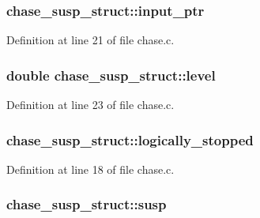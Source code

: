 \subsubsection[{\texorpdfstring{input\+\_\+ptr}{input_ptr}}]{ chase\+\_\+susp\+\_\+struct\+::input\+\_\+ptr}\hypertarget{structchase__susp__struct_a1b2512903a8579d8b1aa07ce6400b570}{}\label{structchase__susp__struct_a1b2512903a8579d8b1aa07ce6400b570}


Definition at line 21 of file chase.\+c.

\subsubsection[{\texorpdfstring{level}{level}}]{\setlength{\rightskip}{0pt plus 5cm}double chase\+\_\+susp\+\_\+struct\+::level}\hypertarget{structchase__susp__struct_ad5e4cbfa7a7cd17bd41fb7fa50c70836}{}\label{structchase__susp__struct_ad5e4cbfa7a7cd17bd41fb7fa50c70836}


Definition at line 23 of file chase.\+c.

\subsubsection[{\texorpdfstring{logically\+\_\+stopped}{logically_stopped}}]{ chase\+\_\+susp\+\_\+struct\+::logically\+\_\+stopped}\hypertarget{structchase__susp__struct_a4a108829cac873ae43abe54fb908d435}{}\label{structchase__susp__struct_a4a108829cac873ae43abe54fb908d435}


Definition at line 18 of file chase.\+c.

\subsubsection[{\texorpdfstring{susp}{susp}}]{ chase\+\_\+susp\+\_\+struct\+::susp}\hypertarget{structchase__susp__struct_a511c23fb4db2768ba1645245f142bea0}{}\label{structchase__susp__struct_a511c23fb4db2768ba1645245f142bea0}


